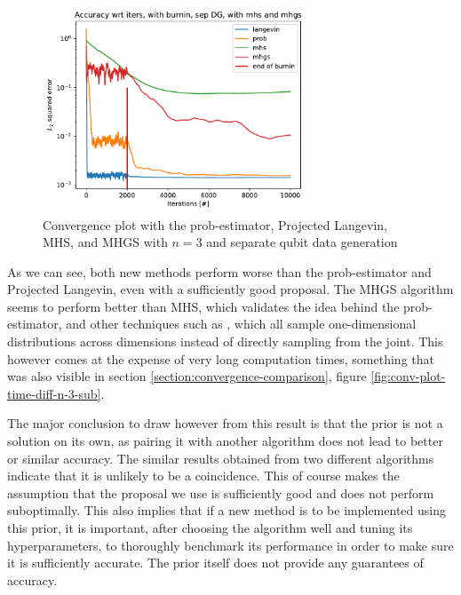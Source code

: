 \documentclass[12pt]{memoir}
\begin{document}
\begin{figure}[H]
    \centering

    \includegraphics[width=0.7\textwidth]{figures/experiments/mhs_mhgs/iters_acc_comp_iters_no_avg_sep_prob_pl_mhs_mhgs-1.png}

    \caption{Convergence plot with the prob-estimator, Projected Langevin, MHS, and MHGS with $n=3$ and separate qubit data generation}

    \label{fig:mhs-mhgs-conv-plot}

\end{figure}




As we can see, both new methods perform worse than the prob-estimator and Projected Langevin, even with a sufficiently good proposal. The MHGS algorithm seems to perform better than MHS, which validates the idea behind the prob-estimator, and other techniques such as \cite{Mai22, LLJL20}, which all sample one-dimensional distributions across dimensions instead of directly sampling from the joint. This however comes at the expense of very long computation times, something that was also visible in section \ref{section:convergence-comparison}, figure \ref{fig:conv-plot-time-diff-n-3-sub}.\medbreak


The major conclusion to draw however from this result is that the prior is not a solution on its own, as pairing it with another algorithm does not lead to better or similar accuracy. The similar results obtained from two different algorithms indicate that it is unlikely to be a coincidence. This of course makes the assumption that the proposal we use is sufficiently good and does not perform suboptimally. This also implies that if a new method is to be implemented using this prior, it is important, after choosing the algorithm well and tuning its hyperparameters, to thoroughly benchmark its performance in order to make sure it is sufficiently accurate. The prior itself does not provide any guarantees of accuracy.\medbreak
\end{document}

